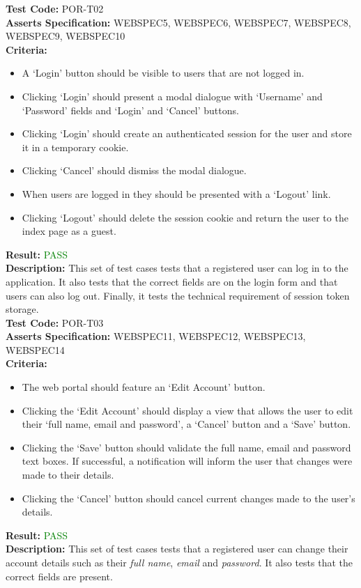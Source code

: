\documentclass[11pt,a4paper]{report}
\begin{document}
\label{test:POR-T02}
\noindent\textbf{Test Code:} POR-T02\\
\textbf{Asserts Specification:} WEBSPEC5, WEBSPEC6, WEBSPEC7, WEBSPEC8, WEBSPEC9, WEBSPEC10 \\ 
\textbf{Criteria:} \begin{itemize}
                     \item A `Login' button should be visible to users that are not logged in.
                     \item Clicking `Login' should present a modal dialogue with `Username' and `Password' fields and `Login' and `Cancel' buttons.
                     \item Clicking `Login' should create an authenticated session for the user and store it in a temporary cookie.
                     \item Clicking `Cancel' should dismiss the modal dialogue.
                     \item When users are logged in they should be presented with a `Logout' link.
                     \item Clicking `Logout' should delete the session cookie and return the user to the index page as a guest.
                   \end{itemize}  
\textbf{Result:} \textcolor{green}{PASS}\\ 
\textbf{Description:} This set of test cases tests that a registered user can log in to the application. It also tests that the correct fields are on the login form and that users can also log out. Finally, it tests the technical requirement of session token storage. \\

\label{test:POR-T03}
\noindent\textbf{Test Code:} POR-T03\\
\textbf{Asserts Specification:} WEBSPEC11, WEBSPEC12, WEBSPEC13, WEBSPEC14 \\ 
\textbf{Criteria:} \begin{itemize}
                     \item The web portal should feature an `Edit Account' button.
                     \item Clicking the `Edit Account' should display a view that allows the user to edit their `full name, email and password', a `Cancel' button and a `Save' button.
                     \item Clicking the `Save' button should validate the full name, email and password text boxes. If successful, a notification will inform the user that changes were made to their details.
                     \item Clicking the `Cancel' button should cancel current changes made to the user's details.
                   \end{itemize}  
\textbf{Result:} \textcolor{green}{PASS}\\ 
\textbf{Description:} This set of test cases tests that a registered user can change their account details such as their \emph{full name}, \emph{email} and \emph{password}. It also tests that the correct fields are present. \\
\end{document}
